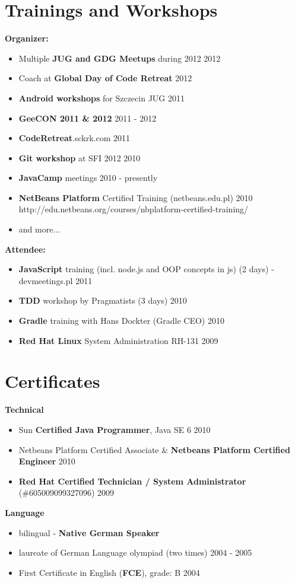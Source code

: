 \documentclass{res}
\begin{document}
\begin{resume}
\section{Trainings and Workshops}
{\bf Organizer:}
\begin{itemize}
 \item Multiple \textbf{JUG and GDG Meetups} during 2012 \hfill 2012 
 \item Coach at \textbf{Global Day of Code Retreat} \hfill 2012
 \item \textbf{Android workshops} for Szczecin JUG \hfill 2011
 \item \textbf{GeeCON 2011 \& 2012} \hfill 2011 - 2012
 \item \textbf{CodeRetreat}.sckrk.com \hfill 2011
 \item \textbf{Git workshop} at SFI 2012 \hfill 2010
 \item \textbf{JavaCamp} meetings \hfill 2010 - presently
 \item \textbf{NetBeans Platform} Certified Training (netbeans.edu.pl) \hfill 2010 \\
	http://edu.netbeans.org/courses/nbplatform-certified-training/ 
 \item and more...
\end{itemize}
{\bf Attendee:}
\begin{itemize}
 \item \textbf{JavaScript} training (incl. node.js and OOP concepts in js) (2 days) - devmeetings.pl \hfill 2011
 \item \textbf{TDD} workshop by Pragmatists (3 days) \hfill 2010
 \item \textbf{Gradle} training with Hans Dockter (Gradle CEO) \hfill 2010
 \item \textbf{Red Hat Linux} System Administration RH-131 \hfill 2009
\end{itemize}

\section{Certificates} 
{\bf Technical}
\begin{itemize}
 \item Sun \textbf{Certified Java Programmer}, Java SE 6 \hfill 2010
 \item Netbeans Platform Certified Associate \& \textbf{Netbeans Platform Certified Engineer} \hfill 2010
 \item \textbf{Red Hat Certified Technician / System
Administrator} (\#605009099327096) \hfill 2009\\
\end{itemize}
{\bf Language}
\begin{itemize}
 \item bilingual - \textbf{Native German Speaker}
 \item laureate of German Language olympiad (two times) \hfill 2004 - 2005
 \item First Certificate in English (\textbf{FCE}), grade: B \hfill 2004
\end{itemize}


\end{resume}
\end{document}

